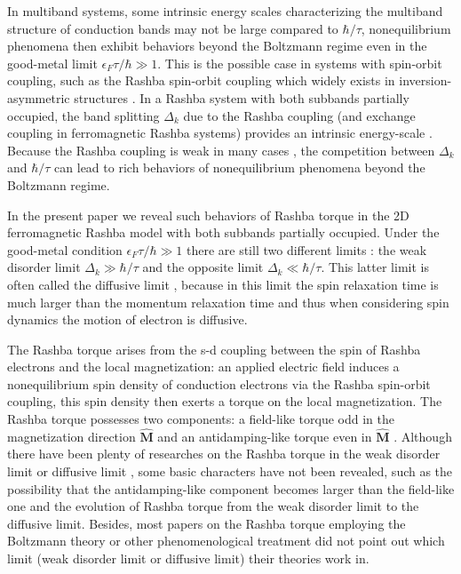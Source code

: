 \documentclass
[aps,pra,amsfonts,amssymb,twocolumn,amsmath,preprintnumbers,nofootinbib,floatfix,
showpacs,superscriptaddress]{revtex4-1}%
\begin{document}
In multiband systems, some intrinsic energy scales characterizing the
multiband structure of conduction bands may not be large compared to
$\hbar/\tau$, nonequilibrium phenomena then exhibit behaviors beyond the
Boltzmann regime even in the good-metal limit $\epsilon_{F}\tau/\hbar\gg1$.
This is the possible case in systems with spin-orbit coupling, such as the
Rashba spin-orbit coupling which widely exists in inversion-asymmetric
structures \cite{Rashba}. In a Rashba system with both subbands partially
occupied, the band splitting $\Delta_{k}$ due to the Rashba coupling (and
exchange coupling in ferromagnetic Rashba systems) provides an intrinsic
energy-scale \cite{Liu2011}. Because the Rashba coupling is weak in many cases
\cite{Rashba}, the competition between $\Delta_{k}$ and $\hbar/\tau$ can lead
to rich behaviors of nonequilibrium phenomena beyond the Boltzmann regime.

In the present paper we reveal such behaviors of Rashba torque
\cite{Li2015,Titov2015,Manchon2012} in the 2D ferromagnetic Rashba model with
both subbands partially occupied. Under the good-metal condition $\epsilon
_{F}\tau/\hbar\gg1$ there are still two different limits
\cite{Liu2011,Culcer2013}: the weak disorder limit $\Delta_{k}\gg\hbar/\tau$
and the opposite limit $\Delta_{k}\ll\hbar/\tau$. This latter limit is often
called the diffusive limit \cite{Burkov2004}, because in this limit the spin
relaxation time is much larger than the momentum relaxation time and thus when
considering spin dynamics the motion of electron is diffusive.

The Rashba torque arises from the s-d coupling between the spin of Rashba
electrons and the local magnetization: an applied electric field induces a
nonequilibrium spin density of conduction electrons via the Rashba spin-orbit
coupling, this spin density then exerts a torque on the local magnetization.
The Rashba torque possesses two components: a field-like torque odd in the
magnetization direction $\mathbf{\hat{M}}$ and an antidamping-like torque even
in $\mathbf{\hat{M}}$ \cite{Li2015}. Although there have been plenty of
researches on the Rashba torque in the weak disorder limit
\cite{Li2015,Titov2015,Xiao2017SOT} or diffusive limit \cite{Manchon2012},
some basic characters have not been revealed, such as the possibility that the
antidamping-like component becomes larger than the field-like one and the
evolution of Rashba torque from the weak disorder limit to the diffusive
limit. Besides, most papers on the Rashba torque employing the Boltzmann
theory or other phenomenological treatment
\cite{Zhang2008,Duine2012,Lee2015,Kim2012} did not point out which limit (weak
disorder limit or diffusive limit) their theories work in.
\end{document}
